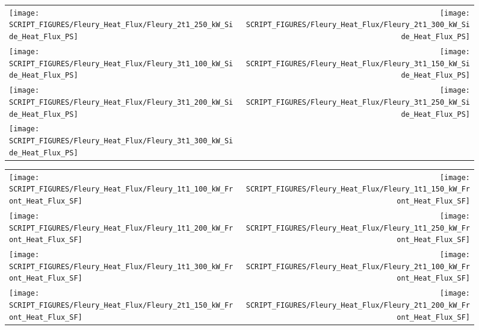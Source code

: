\begin{figure}[!ht]
\begin{tabular*}{\textwidth}{l@{\extracolsep{\fill}}r}
\texttt{[image: SCRIPT\_FIGURES/Fleury\_Heat\_Flux/Fleury\_2t1\_250\_kW\_Side\_Heat\_Flux\_PS]} &
\texttt{[image: SCRIPT\_FIGURES/Fleury\_Heat\_Flux/Fleury\_2t1\_300\_kW\_Side\_Heat\_Flux\_PS]} \\
\texttt{[image: SCRIPT\_FIGURES/Fleury\_Heat\_Flux/Fleury\_3t1\_100\_kW\_Side\_Heat\_Flux\_PS]} &
\texttt{[image: SCRIPT\_FIGURES/Fleury\_Heat\_Flux/Fleury\_3t1\_150\_kW\_Side\_Heat\_Flux\_PS]} \\
\texttt{[image: SCRIPT\_FIGURES/Fleury\_Heat\_Flux/Fleury\_3t1\_200\_kW\_Side\_Heat\_Flux\_PS]} &
\texttt{[image: SCRIPT\_FIGURES/Fleury\_Heat\_Flux/Fleury\_3t1\_250\_kW\_Side\_Heat\_Flux\_PS]} \\
\texttt{[image: SCRIPT\_FIGURES/Fleury\_Heat\_Flux/Fleury\_3t1\_300\_kW\_Side\_Heat\_Flux\_PS]}
\end{tabular*}
\end{figure}

\begin{figure}[!ht]
\begin{tabular*}{\textwidth}{l@{\extracolsep{\fill}}r}
\texttt{[image: SCRIPT\_FIGURES/Fleury\_Heat\_Flux/Fleury\_1t1\_100\_kW\_Front\_Heat\_Flux\_SF]} &
\texttt{[image: SCRIPT\_FIGURES/Fleury\_Heat\_Flux/Fleury\_1t1\_150\_kW\_Front\_Heat\_Flux\_SF]} \\
\texttt{[image: SCRIPT\_FIGURES/Fleury\_Heat\_Flux/Fleury\_1t1\_200\_kW\_Front\_Heat\_Flux\_SF]} &
\texttt{[image: SCRIPT\_FIGURES/Fleury\_Heat\_Flux/Fleury\_1t1\_250\_kW\_Front\_Heat\_Flux\_SF]} \\
\texttt{[image: SCRIPT\_FIGURES/Fleury\_Heat\_Flux/Fleury\_1t1\_300\_kW\_Front\_Heat\_Flux\_SF]} &
\texttt{[image: SCRIPT\_FIGURES/Fleury\_Heat\_Flux/Fleury\_2t1\_100\_kW\_Front\_Heat\_Flux\_SF]} \\
\texttt{[image: SCRIPT\_FIGURES/Fleury\_Heat\_Flux/Fleury\_2t1\_150\_kW\_Front\_Heat\_Flux\_SF]} &
\texttt{[image: SCRIPT\_FIGURES/Fleury\_Heat\_Flux/Fleury\_2t1\_200\_kW\_Front\_Heat\_Flux\_SF]}
\end{tabular*}
\end{figure}

